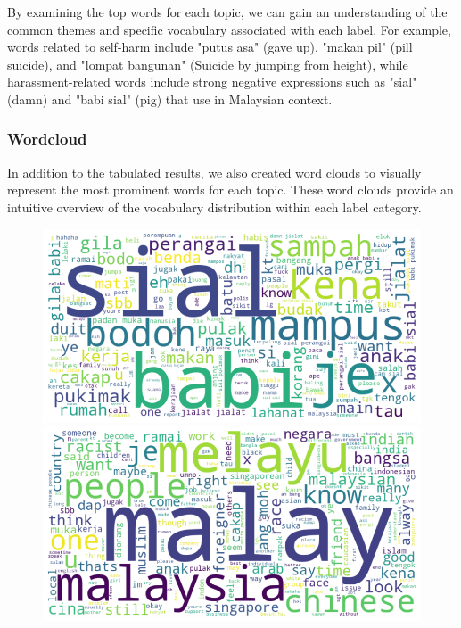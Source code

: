 \documentclass[preprint]{article}
\begin{document}
By examining the top words for each topic, we can gain an understanding of the common themes and specific vocabulary associated with each label. For example, words related to self-harm include "putus asa" (gave up), "makan pil" (pill suicide), and "lompat bangunan" (Suicide by jumping from height), while harassment-related words include strong negative expressions such as "sial" (damn) and "babi sial" (pig) that use in Malaysian context.

\subsubsection*{Wordcloud}

In addition to the tabulated results, we also created word clouds to visually represent the most prominent words for each topic. These word clouds provide an intuitive overview of the vocabulary distribution within each label category.

\newpage

\begin{figure}[h]
  \centering
  \begin{minipage}[b]{0.45\textwidth}
    \centering
    \includegraphics[width=\linewidth]{img/harassment-wordcloud.png}
  \end{minipage}
  \hfill
  \begin{minipage}[b]{0.45\textwidth}
    \centering
    \includegraphics[width=\linewidth]{img/racist-wordcloud.png}
  \end{minipage}
\end{figure}
\end{document}
